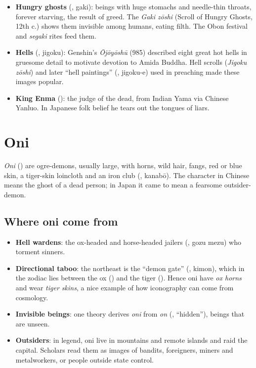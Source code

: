 \begin{itemize}
  \item \textbf{Hungry ghosts} (, gaki): beings with huge stomachs and needle-thin
        throats, forever starving, the result of greed. The \emph{Gaki zōshi} (Scroll of
        Hungry Ghosts, 12th c.) shows them invisible among humans, eating filth. The Obon
        festival and \emph{segaki} rites feed them.
  \item \textbf{Hells} (, jigoku): Genshin's \emph{Ōjōyōshū} (985) described eight
        great hot hells in gruesome detail to motivate devotion to Amida Buddha. Hell
        scrolls (\emph{Jigoku zōshi}) and later ``hell paintings'' (,
        jigoku-e) used in preaching made these images popular.
  \item \textbf{King Enma} (): the judge of the dead, from Indian Yama via Chinese
        Yanluo. In Japanese folk belief he tears out the tongues of liars.
\end{itemize}

\section{Oni}

\begin{definition}[Oni]
\emph{Oni} () are ogre-demons, usually large, with horns, wild hair, fangs, red or
blue skin, a tiger-skin loincloth and an iron club (, kanabō). The character
 in Chinese means the ghost of a dead person; in Japan it came to mean a fearsome
outsider-demon.
\end{definition}

\subsection{Where oni come from}

\begin{itemize}
  \item \textbf{Hell wardens}: the ox-headed and horse-headed jailers (,
        gozu mezu) who torment sinners.
  \item \textbf{Directional taboo}: the northeast is the ``demon gate'' (,
        kimon), which in the zodiac lies between the ox () and the tiger
        (). Hence oni have \emph{ox horns} and wear \emph{tiger skins}, a nice example
        of how iconography can come from cosmology.
  \item \textbf{Invisible beings}: one theory derives \emph{oni} from \emph{on}
        (, ``hidden''), beings that are unseen.
  \item \textbf{Outsiders}: in legend, oni live in mountains and remote islands and raid
        the capital. Scholars read them as images of bandits, foreigners, miners and
        metalworkers, or people outside state control.
\end{itemize}

